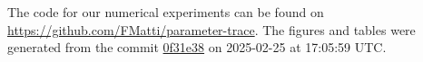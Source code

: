 The code for our numerical experiments can be found on \url{https://github.com/FMatti/parameter-trace}. The figures and tables were generated from the commit \href{https://github.com/FMatti/parameter-trace/tree/0f31e38}{0f31e38} on 2025-02-25 at 17:05:59 UTC.
